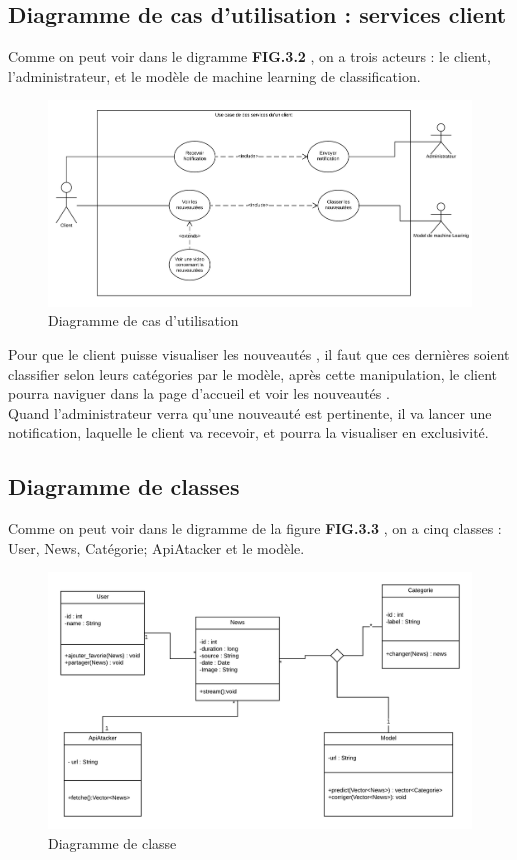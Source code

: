 \subsection{Diagramme de cas d’utilisation : services client}
Comme on peut voir dans le digramme \textbf{FIG.3.2} , on a trois acteurs : le client, l'administrateur, et le modèle de machine learning de classification.\\[0.2cm]
\begin{figure}[h]
	\includegraphics[scale=0.71]{Images/use_case_sanadtech.png}
	\caption{Diagramme de cas d'utilisation}
	\label{fig:cas-utilisation}
\end{figure}

Pour que le client puisse visualiser les nouveautés , il faut que ces dernières soient classifier selon leurs catégories par le modèle, après cette manipulation, le client pourra naviguer dans la page d'accueil et voir les nouveautés .\\[0.2cm]
Quand l'administrateur verra qu'une nouveauté est pertinente, il va lancer une notification, laquelle le client va recevoir, et pourra la visualiser en exclusivité.

\subsection{Diagramme de classes}
Comme on peut voir dans le digramme de la figure \textbf{FIG.3.3} , on a cinq classes : User, News, Catégorie; ApiAtacker et le modèle.\\[0.2cm]
\begin{figure}[H]
	\includegraphics[scale=0.8]{Images/Class_diagram.png}
	\caption{Diagramme de classe}
	\label{fig:classe1}
\end{figure}

